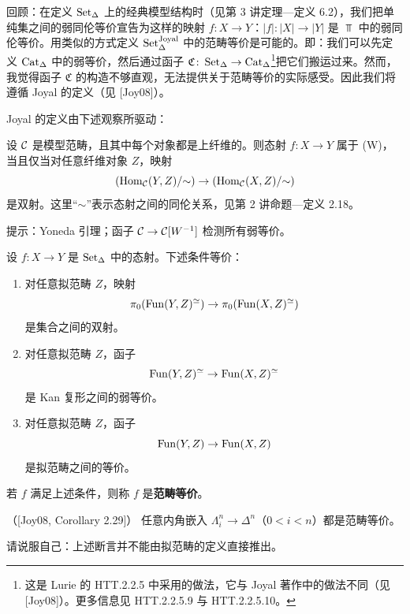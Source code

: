 \nitem\label{L5-4.2} 回顾：在定义 $\operatorname{Set}_\Delta$ 上的经典模型结构时（见第 3 讲定理—定义 6.2），我们把单纯集之间的弱同伦等价宣告为这样的映射 $f\colon X\to Y$：$|f|\colon|X|\to|Y|$ 是 $\Top$ 中的弱同伦等价。用类似的方式定义 $\operatorname{Set}^{\mathrm{Joyal}}_\Delta$ 中的范畴等价是可能的。即：我们可以先定义 $\operatorname{Cat}_\Delta$ 中的弱等价，然后通过函子 $\mathfrak{C}\colon\operatorname{Set}_\Delta\to\operatorname{Cat}_\Delta$\footnote{这是 Lurie 的 HTT.2.2.5 中采用的做法，它与 Joyal 著作中的做法不同（见 [Joy08]）。更多信息见 HTT.2.2.5.9 与 HTT.2.2.5.10。}把它们搬运过来。然而，我觉得函子 $\mathfrak{C}$ 的构造不够直观，无法提供关于范畴等价的实际感受。因此我们将遵循 Joyal 的定义（见 [Joy08]）。

\nitem\label{L5-4.3} Joyal 的定义由下述观察所驱动：

\begin{exercise}\label{L5-4.4}
设 $\mathcal{C}$ 是模型范畴，且其中每个对象都是上纤维的。则态射 $f\colon X\to Y$ 属于 (W)，当且仅当对任意纤维对象 $Z$，映射
\[
(\operatorname{Hom}_{\mathcal{C}}(Y,Z)/{\sim})\to(\operatorname{Hom}_{\mathcal{C}}(X,Z)/{\sim})
\]
是双射。这里“$\sim$”表示态射之间的同伦关系，见第 2 讲命题—定义 2.18。

提示：Yoneda 引理；函子 $\mathcal{C}\to\mathcal{C}[W^{-1}]$ 检测所有弱等价。
\end{exercise}

\begin{theoremdef}\label{L5-4.5}
设 $f\colon X\to Y$ 是 $\operatorname{Set}_\Delta$ 中的态射。下述条件等价：
\begin{enumerate}[label=(\arabic*),leftmargin=2.4em,itemsep=0.1em]
\item 对任意拟范畴 $Z$，映射
\[
\pi_0(\operatorname{Fun}(Y,Z)^{\simeq})\to\pi_0(\operatorname{Fun}(X,Z)^{\simeq})
\]
是集合之间的双射。
\item 对任意拟范畴 $Z$，函子
\[
\operatorname{Fun}(Y,Z)^{\simeq}\to\operatorname{Fun}(X,Z)^{\simeq}
\]
是 Kan 复形之间的弱等价。
\item 对任意拟范畴 $Z$，函子
\[
\operatorname{Fun}(Y,Z)\to\operatorname{Fun}(X,Z)
\]
是拟范畴之间的等价。
\end{enumerate}
若 $f$ 满足上述条件，则称 $f$ 是\textbf{范畴等价}。
\end{theoremdef}

\begin{proposition}\label{L5-4.6}（[Joy08, Corollary 2.29]）
任意内角嵌入 $\Lambda^n_i\to\Delta^n$（$0<i<n$）都是范畴等价。
\end{proposition}

\begin{exercise}\label{L5-4.7}
请说服自己：上述断言并不能由拟范畴的定义直接推出。
\end{exercise}

